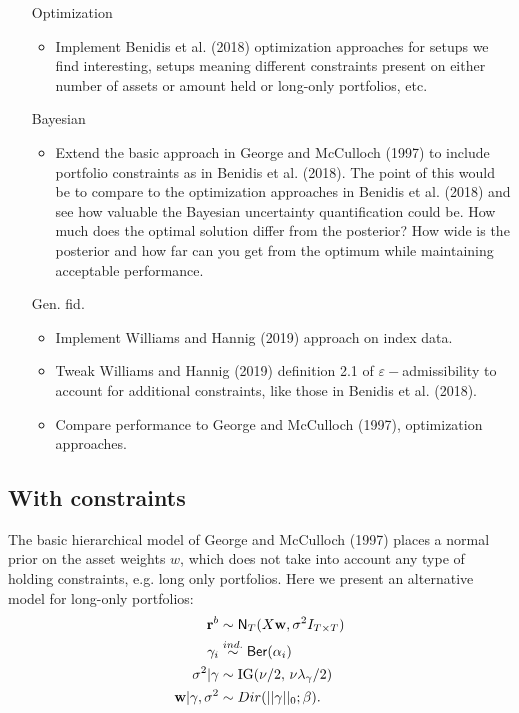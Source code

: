 \documentclass[a4paper, 12pt]{article}
\theoremstyle{plain}
\theoremstyle{definition}
\theoremstyle{remark}
\newcommand{\ber}{{\sf Ber}}
\newcommand{\nm}{{\sf N}}
\newcommand{\eps}{\varepsilon}
\begin{document}
\begin{itemize}
	\item[Optimization]
		\begin{itemize}
		\item Implement Benidis et al. (2018) optimization approaches for setups we find interesting, setups meaning different constraints present on either number of assets or amount held or long-only portfolios, etc.
	\end{itemize}
	\item[Bayesian]
	\begin{itemize}
		\item Extend the basic approach in George and McCulloch (1997) to include portfolio constraints as in Benidis et al. (2018).  The point of this would be to compare to the optimization approaches in Benidis et al. (2018) and see how valuable the Bayesian uncertainty quantification could be.  How much does the optimal solution differ from the posterior?  How wide is the posterior and how far can you get from the optimum while maintaining acceptable performance.
	\end{itemize}
	\item[Gen. fid.]
		\begin{itemize}
			\item Implement Williams and Hannig (2019) approach on index data.
			\item Tweak Williams and Hannig (2019) definition 2.1 of $\eps-$admissibility to account for additional constraints, like those in Benidis et al. (2018).
			\item Compare performance to George and McCulloch (1997), optimization approaches.
	\end{itemize}
\end{itemize}

\subsection{With constraints}

The basic hierarchical model of George and McCulloch (1997) places a normal prior on the asset weights $w$, which does not take into account any type of holding constraints, e.g. long only portfolios.  Here we present an alternative model for long-only portfolios:
\begin{align}
\textbf{r}^b &\sim \nm_{T}(X\textbf{w}, \sigma^2I_{T\times T})\\
\gamma_i &\stackrel{ind.}{\sim} \ber(\alpha_i) \\
\sigma^2 | \gamma & \sim \text{IG}(\nu/2,\,\nu\lambda_\gamma/2)\\
\textbf{w}|\gamma, \sigma^2 & \sim Dir(||\gamma||_0; \beta).
\end{align}
\end{document}
